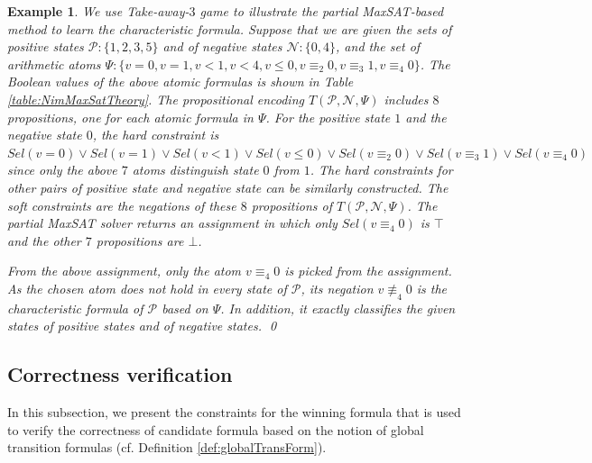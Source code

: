 \documentclass[review]{elsarticle}
\newcommand{\set}[1]{\{ #1 \}}
\newcommand{\true}{\top}
\newcommand{\false}{\bot}
\newcommand{\positiveSet}{\mathcal{P}}
\newcommand{\negativeSet}{\mathcal{N}}
\newcommand{\modulo}{\equiv}
\newcommand{\nmodulo}{\not \equiv}
\newcommand{\featureSet}{\Psi}
\newtheorem{example}{Example}
\begin{document}
    \begin{example} \label{exm:NimMaxSatTheory} %
        We use Take-away-$3$ game to illustrate the partial MaxSAT-based method to learn the characteristic formula.
        Suppose that we are given the sets of positive states $\positiveSet: \set{1, 2, 3, 5}$ and of negative states $\negativeSet: \set{0, 4}$, and the set of arithmetic atoms $\Psi: \set{v = 0, v = 1, v < 1, v < 4, v \leq 0, v \modulo_2 0, v \modulo_3 1, v \modulo_4 0}$.
		The Boolean values of the above atomic formulas is shown in Table \ref{table:NimMaxSatTheory}.
		The propositional encoding $T(\positiveSet, \negativeSet, \featureSet)$ includes $8$ propositions, one for each atomic formula in $\Psi$.
		For the positive state $1$ and the negative state $0$, the hard constraint is
		$Sel(v = 0) \lor Sel(v = 1) \lor Sel(v < 1) \lor Sel(v \leq 0) \lor Sel(v \modulo_2 0) \lor Sel(v \modulo_3 1) \lor Sel(v \modulo_4 0)$ since only the above $7$ atoms distinguish state $0$ from $1$.
		The hard constraints for other pairs of positive state and negative state can be similarly constructed.
		The soft constraints are the negations of these $8$ propositions of $T(\positiveSet, \negativeSet, \featureSet)$.
		The partial MaxSAT solver returns an assignment in which only $Sel(v \modulo_4 0)$ is $\true$ and the other $7$ propositions are $\false$.
	
		From the above assignment, only the atom $v \modulo_4 0$ is picked from the assignment.
		As the chosen atom does not hold in every state of $\positiveSet$, its negation $v \nmodulo_4 0$ is the characteristic formula of $\positiveSet$ based on $\Psi$.
		In addition, it exactly classifies the given states of positive states and of negative states.
		\qed			
     \end{example}
     
\subsection{Correctness verification} \label{sec:winFormCorVer}
    In this subsection, we present the constraints for the winning formula that is used to verify the correctness of candidate formula based on the notion of global transition formulas (cf. Definition \ref{def:globalTransForm}).
	
\end{document}
